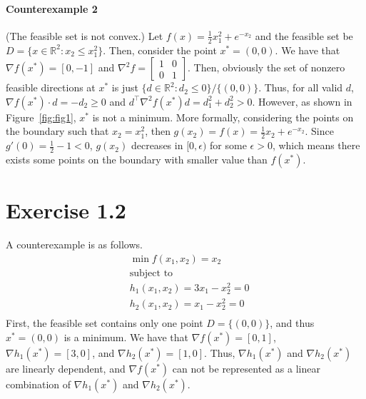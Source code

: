 \documentclass[11pt]{report}
\newcommand{\T}{\intercal}
\begin{document}
\paragraph{Counterexample 2} (The feasible set is not convex.) Let $f(x) = \frac{1}{2}x_1^2 + e^{-x_2}$ and the feasible set be $D = \{x \in \mathbb{R}^2: x_2 \leq x_1^2\}$. Then, consider the point $x^* = (0,0)$. We have that $\nabla f(x^*) = [0, -1]$ and $\nabla^2 f = \begin{bmatrix}1 & 0\\0 & 1\end{bmatrix}$. Then, obviously the set of nonzero feasible directions at $x^*$ is just $\{d \in \mathbb{R}^2: d_2 \leq 0\}/\{(0,0)\}$. Thus, for all valid $d$, $\nabla f(x^*) \cdot d = -d_2 \geq 0$ and $d^\T \nabla^2 f(x^*) d = d_1^2 + d_2^2 > 0$. However, as shown in Figure~\ref{fig:fig1}, $x^*$ is not a minimum. More formally, considering the points on the boundary such that $x_2 = x_1^2$, then $g(x_2) = f(x) = \frac{1}{2}x_2 + e^{-x_2}$. Since $g'(0) = \frac{1}{2} - 1 < 0$, $g(x_2)$ decreases in $[0,\epsilon)$ for some $\epsilon > 0$, which means there exists some points on the boundary with smaller value than $f(x^*)$.

\section*{Exercise 1.2}
A counterexample is as follows.
\begin{align*}
& \min f(x_1, x_2) = x_2\\
& \text{subject to}\\
& h_1(x_1, x_2) = 3x_1 - x_2^2 = 0\\
& h_2(x_1, x_2) = x_1 - x_2^2 = 0\\
\end{align*}
First, the feasible set contains only one point $D = \{(0,0)\}$, and thus $x^* = (0,0)$ is a minimum. We have that $\nabla f(x^*) = [0,1]$, $\nabla h_1(x^*) = [3, 0]$, and $\nabla h_2(x^*) = [1, 0]$. Thus, $\nabla h_1(x^*)$ and $\nabla h_2(x^*)$ are linearly dependent, and $\nabla f(x^*)$ can not be represented as a linear combination of $\nabla h_1(x^*)$ and $\nabla h_2(x^*)$.
\end{document}
